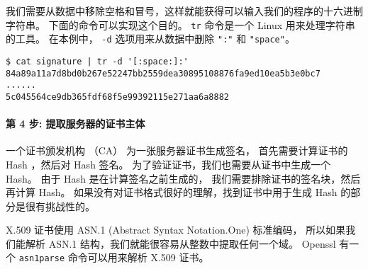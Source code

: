 我们需要从数据中移除空格和冒号，这样就能获得可以输入我们的程序的十六进制字符串。
下面的命令可以实现这个目的。
\texttt{tr} 命令是一个 Linux 用来处理字符串的工具。
在本例中， \texttt{-d} 选项用来从数据中删除 \texttt{":"} 和 \texttt{"space"}。

\begin{lstlisting}
$ cat signature | tr -d '[:space:]:'
84a89a11a7d8bd0b267e52247bb2559dea30895108876fa9ed10ea5b3e0bc7
......
5c045564ce9db365fdf68f5e99392115e271aa6a8882
\end{lstlisting}



\begin{comment}
\begin{lstlisting}
$ openssl x509 -in Chase.crt -text -noout -certopt ca_default
               -certopt no_validity -certopt no_serial
	       -certopt no_subject -certopt no_extensions
	       -certopt no_signame | grep -v 'Signature Algorithm'
	                           | tr -d '[:space:]:'
\end{lstlisting}
\end{comment}



\paragraph{第 4 步: 提取服务器的证书主体}
一个证书颁发机构 （CA） 为一张服务器证书生成签名，
首先需要计算证书的 Hash ，然后对 Hash 签名。
为了验证证书，我们也需要从证书中生成一个 Hash。
由于 Hash 是在计算签名之前生成的，
我们需要排除证书的签名块，然后再计算 Hash。
如果没有对证书格式很好的理解，找到证书中用于生成 Hash 的部分是很有挑战性的。




X.509 证书使用 ASN.1 (Abstract Syntax Notation.One) 标准编码，
所以如果我们能解析 ASN.1 结构，我们就能很容易从整数中提取任何一个域。
Openssl 有一个 \texttt{asn1parse} 命令可以用来解析 X.509 证书。


